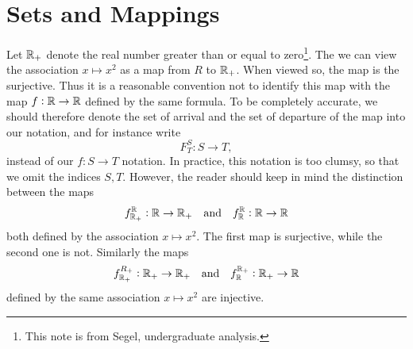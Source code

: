 \chapter{Sets and Mappings}

\begin{remark}
	Let $\mathbb{R}_+$ denote the real number greater than or equal to zero\footnote{This note is from Segel, undergraduate analysis.}. The we can view the association $x \mapsto x^2$ as a map from $R$ to $\mathbb{R}_+$. When viewed so, the map is the surjective. Thus it is a reasonable convention not to identify this map with the map $f:\mathbb{R} \to \mathbb{R}$ defined by the same formula. To be completely accurate, we should therefore denote the set of arrival and the set of departure of the map into our notation, and for instance write
	\[ F^S_T: S \to T, \]
	instead of our $f: S \to T$ notation. In practice, this notation is too clumsy, so that we omit the indices $S, T.$ However, the reader should keep in mind the distinction between the maps 
	\[ f^{\mathbb{R}}_{\mathbb{R}_+}: \mathbb{R} \to \mathbb{R}_+ \quad \text{and} \quad f_{\mathbb{R}}^{\mathbb{R}}: \mathbb{R} \to \mathbb{R}  \]
	both defined by the association $x \mapsto x^2$. The first map is surjective, while the second one is not. Similarly the maps
	\[ f_{\mathbb{R}_+}^{R_+}: \mathbb{R}_+ \to \mathbb{R}_+ \quad \text{and} \quad f_{\mathbb{R}}^{\mathbb{R}_+}: \mathbb{R}_+ \to \mathbb{R} \]
	defined by the same association $x \mapsto x^2$ are injective.
\end{remark}

\begin{remark}

\end{remark}